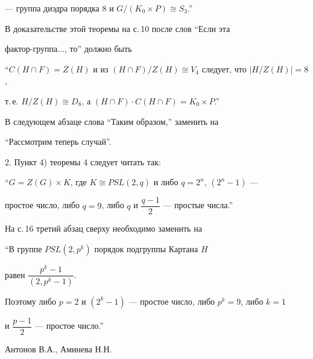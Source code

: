 --- группа диэдра порядка $8$ и $G/(K_0\times P)\cong S_3$.''





В доказательстве этой теоремы на с.\,10 после слов ``Если эта 


фактор-группа$\dotsc$, то'' должно быть\newline


``$C(H\cap F) = Z(H)$ и из $(H\cap F)/Z(H)\cong V_4$ следует, что $|H/Z(H)|=8$,


т.\,е. $H/Z(H)\cong D_8$, а $(H\cap F)\cdot C(H\cap F)= K_0\times P$.''





В следующем абзаце слова ``Таким образом,'' заменить на


``Рассмотрим теперь случай''.





2. Пункт 4) теоремы 4 следует читать так:





``$G=Z(G)\times K$, где $K\cong PSL(2,q)$ и либо $q=2^n$, $(2^n-1)$ --- 


простое число, либо $q=9$, либо $q$ и $\dfrac{q-1}{2}$ --- простые числа.''





На с.\,16 третий абзац сверху необходимо заменить на





``В группе $PSL(2,p^k)$ порядок подгруппы Картана $H$ 


равен $\dfrac{p^k-1}{(2,p^k-1)}$.


Поэтому либо $p=2$ и $(2^k-1)$ --- простое число, либо $p^k= 9$, либо $k=1$


и $\dfrac{p-1}{2}$ --- простое число.''


\medskip





\hfill Антонов В.А., Аминева Н.Н.\\














